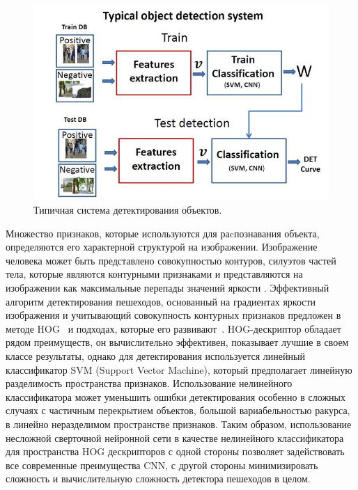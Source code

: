\documentclass[12pt,twoside]{article}
\begin{document}
\begin{figure}[h]
	\includegraphics[width=\linewidth]{fig1}
	\caption{Типичная система детектирования объектов. }
\end{figure}


Множество признаков, которые используются для раcпознавания объекта, определяются его характерной структурой на изображении. Изображение человека может быть представлено совокупностью контуров, силуэтов частей тела, которые являются контурными признаками и представляются на изображении как максимальные перепады значений яркости \cite{Gneushev03}. Эффективный алгоритм детектирования пешеходов, основанный на градиентах яркости изображения и учитывающий совокупность контурных признаков предложен в методе HOG~\cite{dalaltriggs2005} и подходах, которые его развивают~\cite{dpm, Samsonov17}. HOG-дескриптор обладает рядом преимуществ, он вычислительно
эффективен, показывает лучшие в своем классе результаты, однако для детектирования используется линейный классификатор SVM (Support Vector Machine), который предполагает линейную разделимость пространства признаков. Использование нелинейного классификатора может уменьшить ошибки детектирования особенно в сложных случаях с частичным перекрытием объектов, большой вариабельностью ракурса, в линейно неразделимом пространстве признаков. Таким образом, использование несложной сверточной нейронной сети в качестве нелинейного классификатора для пространства HOG дескрипторов с одной стороны позволяет задействовать все современные преимущества CNN, с другой стороны минимизировать сложность и вычислительную сложность детектора пешеходов в целом.
\end{document}
